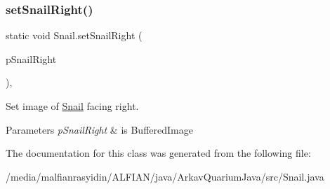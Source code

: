 \subsubsection{\texorpdfstring{set\+Snail\+Right()}{setSnailRight()}}
{\footnotesize\ttfamily static void Snail.\+set\+Snail\+Right (\begin{DoxyParamCaption}\item[{final Buffered\+Image}]{p\+Snail\+Right }\end{DoxyParamCaption})\hspace{0.3cm}{\ttfamily [inline]}, {\ttfamily [static]}}

Set image of \mbox{\hyperlink{class_snail}{Snail}} facing right.


\begin{DoxyParams}{Parameters}
{\em p\+Snail\+Right} & is Buffered\+Image \\
\hline
\end{DoxyParams}


The documentation for this class was generated from the following file\+:\begin{DoxyCompactItemize}
\item 
/media/malfianrasyidin/\+A\+L\+F\+I\+A\+N/java/\+Arkav\+Quarium\+Java/src/Snail.\+java\end{DoxyCompactItemize}

